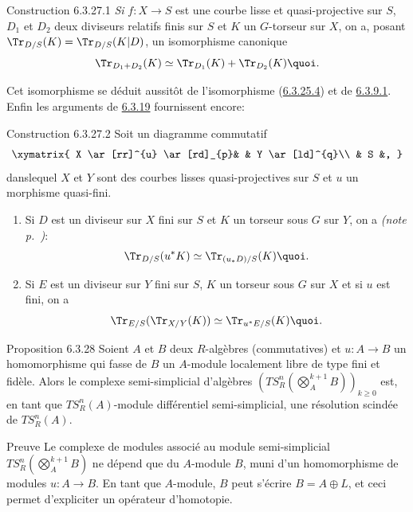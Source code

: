 \documentclass[10pt]{../fichiers-configuration-latex/smfart}
\begin{document}
\begin{enonce*}{Construction 6.3.27.1}
\emph{Si} $f:X\rightarrow S$ est une courbe lisse et quasi-projective
sur $S$, $D_{1}$ et $D_{2}$ deux diviseurs relatifs finis sur $S$ et
$K$ un $G$-torseur sur $X$, on a, posant
$\Tr_{D/S}(K)=\Tr_{D/S}(K|D)$, un isomorphisme canonique
$$
\Tr_{D_{1}+D_{2}}(K)\simeq \Tr_{D_{1}}(K)+\Tr_{D_{2}}(K){\quoi}.
$$
\end{enonce*}

\sisi{\noindent}{}%
Cet isomorphisme se déduit aussitôt de l'isomorphisme (\hyperref[XVII.par6.3.25.4]{6.3.25.4}) et de
\hyperref[XVII.lem6.3.9.1]{6.3.9.1}. Enfin les arguments de \hyperref[XVII.prop6.3.19]{6.3.19} fournissent encore:

\begin{enonce*}{Construction 6.3.27.2}
Soit un diagramme commutatif
$$
\xymatrix{
X   \ar[rr]^{u} \ar[rd]_{p}&     &  Y \ar[ld]^{q}\\
     &   S &,
}
$$
dans\pageoriginale lequel $X$ et $Y$ sont des courbes lisses
quasi-projectives sur $S$ et $u$ un morphisme quasi-fini.
\begin{enumerate}
\renewcommand{\theenumi}{\roman{enumi}}
\renewcommand{\labelenumi}{(\theenumi)}
\item Si $D$ est un diviseur sur $X$ fini sur $S$ et $K$ un torseur
sous $G$ sur $Y$, on a \emph{(\cf note p.~\pageref{XVII.note192})}:
$$
\Tr_{D/S}(u^{\ast}K)\simeq \Tr_{(u_{\ast}D)/S}(K){\quoi}.
$$

\item Si $E$ est un diviseur sur $Y$ fini sur $S$, $K$ un torseur sous
$G$ sur $X$ et si $u$ est fini, on a
$$
\Tr_{E/S}(\Tr_{X/Y}(K))\simeq \Tr_{u^{\ast}E/S}(K){\quoi}.
$$
\end{enumerate}
\end{enonce*}

\begin{enonce*}{Proposition 6.3.28}
Soient $A$ et $B$ deux $R$-algèbres (commutatives) et $u:A\rightarrow
B$ un homomorphisme qui fasse de $B$ un $A$-module localement libre de
type fini et fidèle. Alors le complexe semi-simplicial d'algèbres
$(TS^{n}_{R}(\bigotimes\limits^{k+1}_{A}B))_{k\geq 0}$
est, en tant que $TS^{n}_{R}(A)$-module différentiel semi-simplicial,
une résolution scindée de $TS^{n}_{R}(A)$.
\end{enonce*}

\begin{enonce*}[remark]{Preuve}
Le complexe de modules associé au module semi-simplicial
$TS^{n}_{R}(\bigotimes\limits^{k+1}_{A}B)$ ne dépend que
du $A$-module $B$, muni d'un homomorphisme de modules $u:A\rightarrow
B$. En tant que $A$-module, $B$ peut s'écrire $B=A\oplus L$, et ceci
permet d'expliciter un opérateur d'homotopie.
\end{enonce*}
\end{document}

